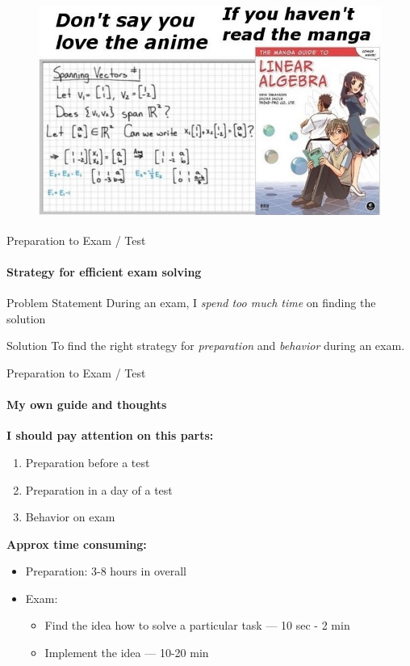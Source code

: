 \documentclass[aspectratio=169]{beamer}
\begin{document}
\begin{frame}[t]{}
    \framesubtitle{}
    \begin{figure}[H]
        \centering\includegraphics[height=7cm,width=1\textwidth,keepaspectratio]{agla_manga.jpeg}
        \label{fig:agla_manga.jpeg}
    \end{figure}
\end{frame}


\begin{frame}[t]{Preparation to Exam / Test}
    \framesubtitle{Strategy for efficient exam solving}
    \begin{exampleblock}{Problem Statement}
        During an exam, I \textit{spend too much time} on finding the solution
    \end{exampleblock}
    \begin{alertblock}{Solution}
        To find the right strategy for \textit{preparation} and \textit{behavior} during an exam.
    \end{alertblock}
\end{frame}

\begin{frame}[t]{Preparation to Exam / Test}
    \framesubtitle{My own guide and thoughts}
    \textbf{ I should pay attention on this parts:}
    \begin{enumerate}
        \item Preparation before a test
        \item Preparation in a day of a test
        \item Behavior on exam
    \end{enumerate}

    \textbf{Approx time consuming:}
    \begin{itemize}
        \item Preparation: 3-8 hours in overall
        \item Exam: \begin{itemize}
                  \item Find the idea how to solve a particular task --- 10 sec - 2 min
                  \item Implement the idea — 10-20 min
              \end{itemize}
    \end{itemize}
\end{frame}
\end{document}
